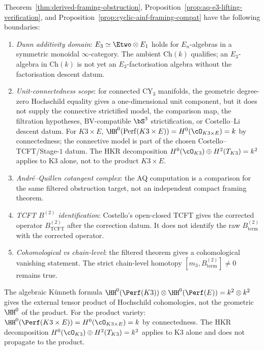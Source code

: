 \begin{remark}
\label{rem:e3-obstruction-boundary-checks}
Theorem~\ref{thm:derived-framing-obstruction},
Proposition~\ref{prop:aq-e3-lifting-verification}, and
Proposition~\ref{prop:cyclic-ainf-framing-compat} have the following
boundaries:
\begin{enumerate}[label=\textup{(\roman*)}]
 \item \emph{Dunn additivity domain}: $E_3 \simeq \Etwo \otimes E_1$
 holds for $E_n$-algebras in a symmetric monoidal $\infty$-category.
 The ambient $\mathrm{Ch}(k)$ qualifies; an $E_3$-algebra in
 $\mathrm{Ch}(k)$ is not yet an $E_3$-factorisation algebra without the
 factorisation descent datum.
 \item \emph{Unit-connectedness scope}: for connected CY$_3$ manifolds,
 the geometric degree-zero Hochschild equality gives a one-dimensional
 unit component,
 but it does not supply the connective strictified model, the comparison
 map, the filtration hypotheses, BV-compatible $\bS^3$ strictification,
 or Costello--Li descent datum. For $K3 \times E$,
 $\HH^0(\mathrm{Perf}(K3 \times E)) = H^0(\cO_{K3 \times E}) = k$ by
 connectedness; the connective model is part of the chosen
 Costello--TCFT/Stage-$1$ datum. The HKR decomposition
 $H^0(\cO_{K3}) \oplus H^2(T_{K3}) = k^2$ applies to K3 alone, not to
 the product $K3 \times E$.
 \item \emph{Andr\'e--Quillen cotangent complex}: the AQ computation is a
 comparison for the same filtered obstruction target, not an independent
 compact framing theorem.
 \item \emph{TCFT $B^{(2)}$ identification}: Costello's open-closed TCFT
 gives the corrected operator $B^{(2)}_{\mathrm{TCFT}}$ after the
 correction datum. It does not identify the raw
 $B^{(2)}_{\mathrm{term}}$ with the corrected operator.
 \item \emph{Cohomological vs chain-level}: the filtered theorem gives a
 cohomological vanishing statement. The strict chain-level homotopy
 $[m_3,B^{(2)}_{\mathrm{term}}]\neq0$ remains true.
\end{enumerate}
\end{remark}

\begin{remark}
\label{rem:k3e-unit-connected}
The algebraic K\"unneth formula $\HH^0(\Perf(K3)) \otimes \HH^0(\Perf(E))
= k^2 \otimes k^2$ gives the external tensor product of Hochschild
cohomologies, not the geometric $\HH^0$ of the product. For the product
variety: $\HH^0(\Perf(K3 \times E)) = H^0(\cO_{K3 \times E}) = k$ by
connectedness. The HKR decomposition $H^0(\cO_{K3}) \oplus H^2(T_{K3})
= k^2$ applies to K3 alone and does not propagate to the product.
\end{remark}



